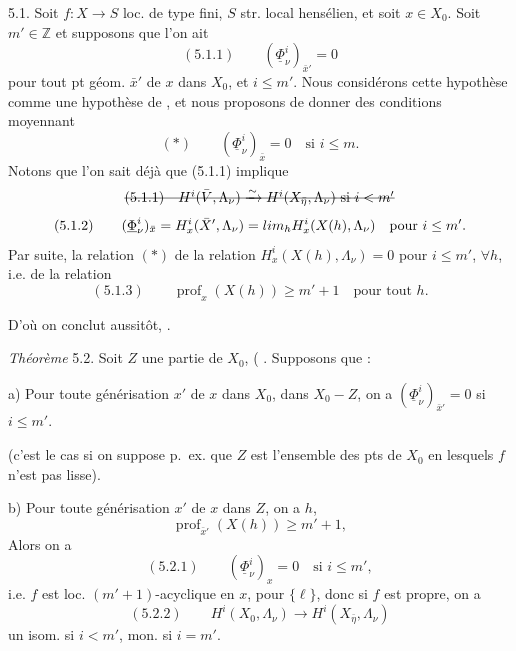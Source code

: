 \documentclass[11pt,a4paper]{article}
\begin{document}
5.1. Soit $f : X \to S$ loc. de type fini, $S$ str. local hensélien, et soit
$x \in X_0$. Soit $m' \in \mathbb{Z}$ et supposons que l'on ait
\[
(5.1.1)\qquad (\underline{\Phi}^i_\nu)_{\bar x'} = 0
\]
pour \struck{\ill{}} tout pt géom. $\bar x'$  de $x$ dans $X_0$, et
$i \leq m'$.  Nous considérons cette hypothèse comme une hypothèse de
, et nous proposons de donner des conditions moyennant \ill{}
\[
(*)\qquad (\underline{\Phi}^i_\nu)_{\bar x} = 0 \quad \text{si } i \leq m .
\]
Notons que l'on sait déjà que (5.1.1) implique
\[
\text{\struck{$(5.1.1)\quad H^i(\bar V, \Lambda_\nu) \xrightarrow{\sim} H^i(X_{\bar\eta}, \Lambda_\nu)$ si $i < m'$}}
\]
\struck{\ill{}}
\[
(5.1.2)\qquad (\underline{\Phi}^i_\nu)_{\bar x} = H^i_x(\bar X', \Lambda_\nu)
= \varinjlim_h H^i_x(X(h), \Lambda_\nu) \quad \text{pour } i \leq m' .
\]
Par suite, \struck{\ill{}} la relation $(*)$  
de la relation $H^i_x(X(h), \Lambda_\nu) = 0$ pour $i \leq m'$, $\forall h$, i.e.
 de la relation
\[
(5.1.3)\qquad \operatorname{prof}_x(X(h)) \geq m'+1 \quad \text{pour tout } h .
\]

D'où \struck{\ill{}} on conclut aussitôt,  .

\emph{ Théorème} 5.2. Soit $Z$ une partie de $X_0$,
( \ill{}. Supposons que :

a) Pour toute générisation $x'$ de $x$ dans $X_0$, 
 dans $X_0 - Z$, on a $(\underline{\Phi}^i_\nu)_{\bar x'} = 0$ si $i \leq m'$.


(c'est le cas si on suppose p.~ex. que $Z$ est l'ensemble des pts de $X_0$ en lesquels
$f$ n'est pas lisse).

b) Pour toute générisation $x'$ de $x$ dans $Z$,  on a
\struck{\ill{}}  $h$,
\[
\operatorname{prof}_{\bar x'}(X(h)) \geq m'+1 ,
\]
 Alors on a
\[
(5.2.1)\qquad (\underline{\Phi}^i_\nu)_x = 0 \quad \text{si } i \leq m' ,
\]
i.e. $f$ est loc. $(m'+1)$-acyclique en $x$, pour \struck{\ill{}} $\{\ell\}$, donc si $f$ est
propre, on a
\[
(5.2.2)\qquad H^i(X_0, \Lambda_\nu) \longrightarrow H^i(X_{\bar\eta}, \Lambda_\nu)
\]
un isom. si $i < m'$, mon. si $i = m'$.
\end{document}
